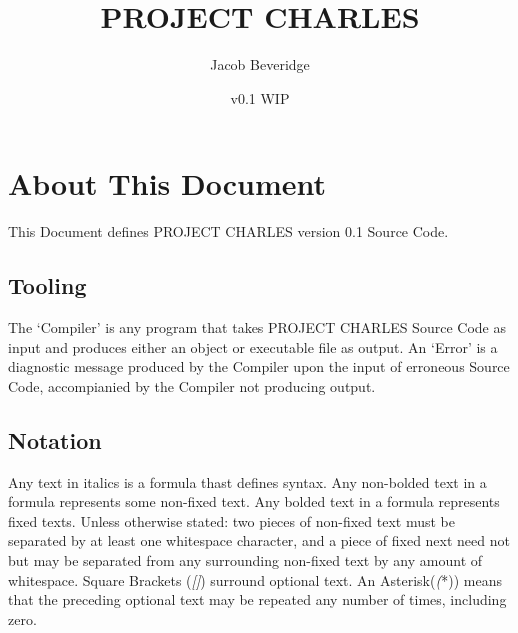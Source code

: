 \documentclass{article}
\title{PROJECT CHARLES}
\author{Jacob Beveridge}
\date{v0.1 WIP}
\begin{document}
\newcommand{\ret}{$\bm{-\!\!>}$}

\maketitle
\tableofcontents
\section{About This Document}
	This Document defines PROJECT CHARLES version 0.1 Source Code.
	\subsection{Tooling} The `Compiler' is any program that takes PROJECT CHARLES Source Code as input and produces either an object or executable file as output. An `Error' is a diagnostic message produced by the Compiler upon the input of erroneous Source Code, accompianied by the Compiler not producing output.
	\subsection{Notation} Any text in italics is a formula thast defines syntax. Any non-bolded text in a formula represents some non-fixed text. Any bolded text in a formula represents fixed texts. Unless otherwise stated: two pieces of non-fixed text must be separated by at least one whitespace character, and a piece of fixed next need not but may be separated from any surrounding non-fixed text by any amount of whitespace. Square Brackets (\textit{[]}) surround optional text. An Asterisk(\textit(*)) means that the preceding optional text may be repeated any number of times, including zero.
\end{document}
